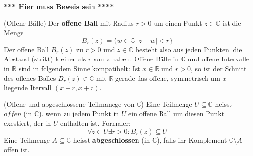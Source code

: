 \documentclass[../Analysis1_script.tex]{subfiles}
\begin{document}
	\textbf{*** Hier muss Beweis sein ****}

\begin{definition}{(Offene Bälle)}
	Der \textbf{offene Ball} mit Radius $r > 0$ um einen Punkt $z \in \mathbb{C}$ ist die Menge
	\[B_r(z) = \{w \in \mathbb{C}\big| |z - w| < r\}\]
	Der offene Ball $B_r(z)$ zu $r > 0$ und $z \in \mathbb{C}$ besteht also aus jeden Punkten, die Abstand (strikt) kleiner als $r$ von $z$ haben. Offene Bälle in $\mathbb{C}$ und offene Intervalle in $\mathbb{R}$ sind in folgendem Sinne kompatibelt: Ist $x \in \mathbb{R}$ und $r > 0$, so ist der Schnitt des offenes Balles $B_r(z) \in \mathbb{C}$ mit $\mathbb{R}$ gerade das offene, symmetrisch um $x$ liegende Itervall $(x - r, x + r)$. 
	
	
\end{definition}

	

\begin{definition}{(Offene und abgeschlossene Teilmanege von $\mathbb{C}$)}
	Eine Teilmenge $U \subseteq \mathbb{C}$ heisst $offen$ (in $\mathbb{C}$), wenn zu jedem Punkt in $U$ ein offene Ball um diesen Punkt exestiert, der in $U$ enthalten ist. Formaler:
	\[\forall z \in U \exists r > 0 : B_r(z) \subseteq U\]
	Eine Teilmenge $A \subseteq \mathbb{C}$ heisst \textbf{abgeschlossen} (in $\mathbb{C}$), falls ihr Komplement $\mathbb{C} \setminus A$ offen ist.
\end{definition}
\end{document}
